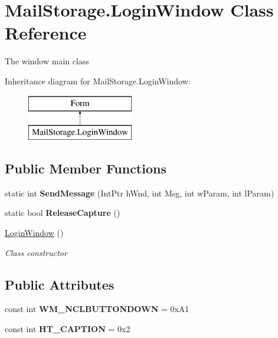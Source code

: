 \hypertarget{class_mail_storage_1_1_login_window}{}\section{Mail\+Storage.\+Login\+Window Class Reference}
\label{class_mail_storage_1_1_login_window}


The window main class  


Inheritance diagram for Mail\+Storage.\+Login\+Window\+:\begin{figure}[H]
\begin{center}
\leavevmode
\includegraphics[height=2.000000cm]{class_mail_storage_1_1_login_window}
\end{center}
\end{figure}
\subsection*{Public Member Functions}
\begin{DoxyCompactItemize}
\item 
\mbox{\label{class_mail_storage_1_1_login_window_a6b8e304b549a9eb2a38ed2d6375982a2}} 
static int {\bfseries Send\+Message} (Int\+Ptr h\+Wnd, int Msg, int w\+Param, int l\+Param)
\item 
\mbox{\label{class_mail_storage_1_1_login_window_a47f4a1016d7636c31560a4b315fa14e0}} 
static bool {\bfseries Release\+Capture} ()
\item 
\hyperlink{class_mail_storage_1_1_login_window_a753823a2cafd3253de32a8210d7e0edf}{Login\+Window} ()
\begin{DoxyCompactList}\small\item\em Class constructor \end{DoxyCompactList}\end{DoxyCompactItemize}
\subsection*{Public Attributes}
\begin{DoxyCompactItemize}
\item 
\mbox{\label{class_mail_storage_1_1_login_window_a42f7a7d7b8fd211f2f86901863677132}} 
const int {\bfseries W\+M\+\_\+\+N\+C\+L\+B\+U\+T\+T\+O\+N\+D\+O\+WN} = 0x\+A1
\item 
\mbox{\label{class_mail_storage_1_1_login_window_a96f19a37bb5abefd4e1ac01517f6e751}} 
const int {\bfseries H\+T\+\_\+\+C\+A\+P\+T\+I\+ON} = 0x2
\end{DoxyCompactItemize}
